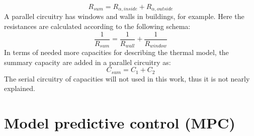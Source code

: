     \begin{equation}
    \label{eq:resistanceseriel}
        R_{sum} = R_{\alpha,inside} + R_{\alpha,outside}
    \end{equation}
    A parallel circuitry has windows and walls in buildings, for example. Here the resistances are calculated according to the following schema:
    \begin{equation}
    \label{eq:resistancesparallel}
        \frac{1}{R_{sum}} = \frac{1}{R_{wall}} + \frac{1}{R_{window}}
    \end{equation}
    In terms of needed more capacities for describing the thermal model, the summary capacity are added in a parallel circuitry as: 
    \begin{equation}
    \label{eq:capacity}
         C_{sum} = C_1 + C_2
    \end{equation}
    The serial circuitry of capacities will not used in this work, thus it is not nearly explained.


\section{Model predictive control (MPC)}
\label{section:mpc}

